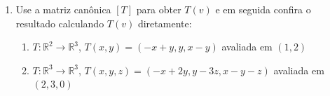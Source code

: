 \documentclass[a4paper,5pt]{amsbook}
\begin{document}
\begin{enumerate}
	\vspace{0.5cm}
	\item Use a matriz can\^onica $[T]$ para obter $T(v)$ e em seguida confira
		o resultado calculando $T(v)$ diretamente:
		\begin{enumerate}
			\item $T: \mathbb{R}^2 \rightarrow \mathbb{R}^3$, $T(x,y) = (-x+y,
				y, x-y)$ avaliada em $(1,2)$
			\item $T: \mathbb{R}^3 \rightarrow \mathbb{R}^3$, $T(x,y,z) =
				(-x+2y, y-3z, x-y-z)$ avaliada em $(2,3,0)$
		\end{enumerate}
\end{enumerate}
\end{document}
